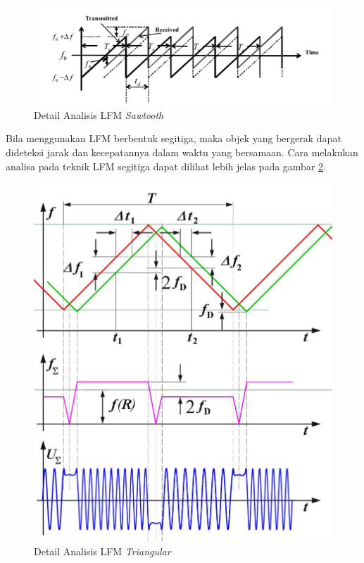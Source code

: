 \begin{figure}
	\begin{center}
		\includegraphics[scale=0.65]{pics/bab2/lfmDetail.png}
		\caption[Detail Analisis LFM \textit{Sawtooth}]{Detail Analisis LFM \textit{Sawtooth} \cite{Jankiraman2018}}
		\label{pic:lfmDetail}
	\end{center}
\end{figure}

Bila menggunakan LFM berbentuk segitiga, maka objek yang bergerak dapat dideteksi jarak dan kecepatannya dalam waktu yang bersamaan. Cara melakukan analisa pada teknik LFM segitiga dapat dilihat lebih jelas pada gambar \ref{pic:DetailMod}.

\begin{figure}
	\begin{center}
		\includegraphics[scale=0.26]{pics/bab2/DetailMod.jpg}
		\caption[Detail Analisa LFM \textit{Triangular}]{Detail Analisis LFM \textit{Triangular}}
		\label{pic:DetailMod}
	\end{center}
\end{figure}

